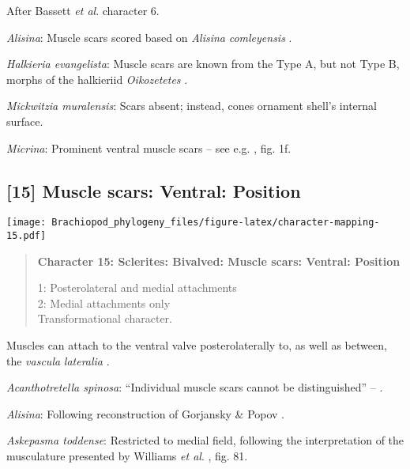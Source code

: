 \documentclass[openany]{book}
\theoremstyle{definition}
\theoremstyle{definition}
\theoremstyle{definition}
\theoremstyle{remark}
\begin{document}
After Bassett \emph{et al}.
\citeyearpar{Bassett2001Functionalmorphology} character 6.

\hypertarget{Alisina-coding-14}{}
\emph{Alisina}: Muscle scars scored based on \emph{Alisina}
\emph{comleyensis} \citep{Bassett2001Functionalmorphology}.

\hypertarget{Halkieria_evangelista-coding-14}{}
\emph{Halkieria evangelista}: Muscle scars are known from the Type A,
but not Type B, morphs of the halkieriid \emph{Oikozetetes}
\citep{Paterson2009, Jacquet2014}.

\hypertarget{Mickwitzia_muralensis-coding-14}{}
\emph{Mickwitzia muralensis}: Scars absent; instead, cones ornament
shell's internal surface.

\hypertarget{Micrina-coding-14}{}
\emph{Micrina}: Prominent ventral muscle scars -- see e.g.
\citet{Holmer2008TheEarly}, fig. 1f.

\subsection*{{[}15{]} Muscle scars: Ventral:
Position}\label{muscle-scars-ventral-position}

\texttt{[image: Brachiopod\_phylogeny\_files/figure-latex/character-mapping-15.pdf]}

\begin{quote}
\textbf{Character 15: Sclerites: Bivalved: Muscle scars: Ventral:
Position}

1: Posterolateral and medial attachments\\
2: Medial attachments only\\
Transformational character.
\end{quote}

Muscles can attach to the ventral valve posterolaterally to, as well as
between, the \emph{vascula} \emph{lateralia}
\citep{Popov1992TheCambrian}.

\hypertarget{Acanthotretella_spinosa-coding-15}{}
\emph{Acanthotretella spinosa}: ``Individual muscle scars cannot be
distinguished'' -- \citet{Holmer2006Aspinose}.

\hypertarget{Alisina-coding-15}{}
\emph{Alisina}: Following reconstruction of Gorjansky \& Popov
\citeyearpar{Gorjansky1986Onthe}.

\hypertarget{Askepasma_toddense-coding-15}{}
\emph{Askepasma toddense}: Restricted to medial field, following the
interpretation of the musculature presented by Williams \emph{et al}.
\citeyearpar{Williams2000LinguliformeaCraniiformea}, fig. 81.
\end{document}
